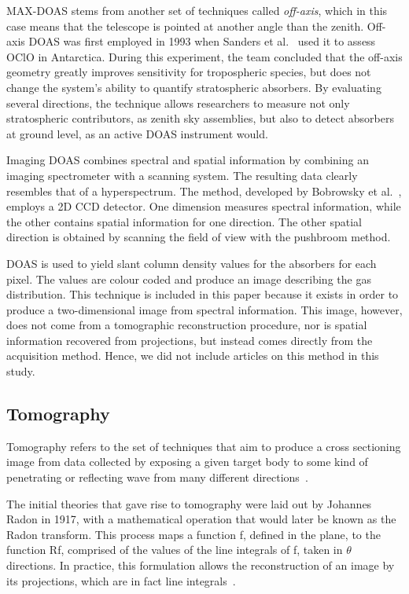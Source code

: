 MAX-DOAS stems from another set of techniques called \emph{off-axis},
which in this case means that the telescope is pointed at another angle
than the zenith. Off-axis DOAS was first employed in 1993 when Sanders
et al.~\cite{Sanders1993} used it to assess OClO in Antarctica. During
this experiment, the team concluded that the off-axis geometry greatly
improves sensitivity for tropospheric species, but does not change the
system's ability to quantify stratospheric absorbers. By evaluating
several directions, the technique allows researchers to measure not only
stratospheric contributors, as zenith sky assemblies, but also to detect
absorbers at ground level, as an active DOAS instrument would.

Imaging DOAS combines spectral and spatial information by combining an
imaging spectrometer with a scanning system. The resulting data clearly
resembles that of a hyperspectrum. The method, developed by Bobrowsky et
al.~\cite{Bobrowski2006}, employs a 2D CCD detector. One dimension
measures spectral information, while the other contains spatial
information for one direction. The other spatial direction is obtained
by scanning the field of view with the pushbroom method.

DOAS is used to yield slant column density values for the absorbers for
each pixel. The values are colour coded and produce an image describing
the gas distribution. This technique is included in this paper because
it exists in order to produce a two-dimensional image from spectral
information. This image, however, does not come from a tomographic
reconstruction procedure, nor is spatial information recovered from
projections, but instead comes directly from the acquisition method.
Hence, we did not include articles on this method in this study.

\subsection{Tomography}
\label{sub:tomography}
Tomography refers to the set of techniques that aim to produce a cross
sectioning image from data collected by exposing a given target body to
some kind of penetrating or reflecting wave from many different
directions~\cite{Herman2009, Kak2001a}.

The initial theories that gave rise to tomography were laid out by
Johannes Radon in 1917, with a mathematical operation that  would later
be known as the Radon transform. This process maps a function f, defined
in the plane, to the function Rf, comprised of the values of the line
integrals of f, taken in $\theta$ directions. In practice, this
formulation allows the reconstruction of an image by its projections,
which are in fact line integrals~\cite{Feeman2010}.

